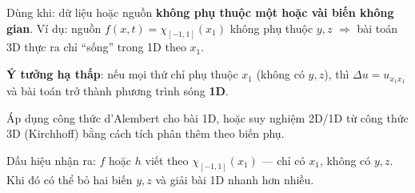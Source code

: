 \begin{dieukienbox}
Dùng khi: dữ liệu hoặc nguồn \textbf{không phụ thuộc một hoặc vài biến không gian}.
Ví dụ: nguồn $f(x,t)=\chi_{[-1,1]}(x_1)$ không phụ thuộc $y,z$
$\Rightarrow$ bài toán 3D thực ra chỉ ``sống'' trong 1D theo $x_1$.
\end{dieukienbox}

\begin{nhobox}
\textbf{Ý tưởng hạ thấp}: nếu mọi thứ chỉ phụ thuộc $x_1$ (không có $y,z$),
thì $\Delta u = u_{x_1 x_1}$ và bài toán trở thành phương trình sóng \textbf{1D}.

Áp dụng công thức d'Alembert cho bài 1D, hoặc suy nghiệm 2D/1D từ công thức 3D (Kirchhoff) bằng cách tích phân thêm theo biến phụ.
\end{nhobox}

\begin{meobox}
Dấu hiệu nhận ra: $f$ hoặc $h$ viết theo $\chi_{[-1,1]}(x_1)$ --- chỉ có $x_1$, không có $y,z$.
Khi đó có thể bỏ hai biến $y,z$ và giải bài 1D nhanh hơn nhiều.
\end{meobox}

